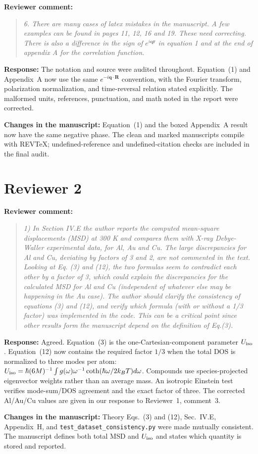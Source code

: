 \documentclass[11pt]{article}
\newcommand{\Question}[1]{\par\medskip\noindent\textbf{Reviewer comment:}\par\begin{quote}\itshape #1\end{quote}}
\newcommand{\Answer}[1]{\par\noindent\color{black}\normalfont\textbf{Response:} #1\par\smallskip}
\newcommand{\Change}[1]{\par\noindent\color{revisionblue}\normalfont\textbf{Changes in the manuscript:} #1\par\color{black}\medskip}
\begin{document}
\Question{6. There are many cases of latex mistakes in the manuscript. A few examples can be found in pages 11, 12, 16 and 19. These need correcting. There is also a difference in the sign of $e^{i\mathbf q\mathbf r}$ in equation 1 and at the end of appendix A for the correlation function.}

\Answer{The notation and source were audited throughout. Equation~(1) and Appendix~A now use the same $e^{-i\mathbf q\cdot\mathbf R}$ convention, with the Fourier transform, polarization normalization, and time-reversal relation stated explicitly. The malformed units, references, punctuation, and math noted in the report were corrected.}

\Change{Equation~(1) and the boxed Appendix~A result now have the same negative phase. The clean and marked manuscripts compile with REVTeX; undefined-reference and undefined-citation checks are included in the final audit.}

\section*{Reviewer 2}

\Question{1) In Section IV.E the author reports the computed mean-square displacements (MSD) at 300 K and compares them with X-ray Debye-Waller experimental data, for Al, Au and Cu. The large discrepancies for Al and Cu, deviating by factors of 3 and 2, are not commented in the text. Looking at Eq. (3) and (12), the two formulas seem to contradict each other by a factor of 3, which could explain the discrepancies for the calculated MSD for Al and Cu (independent of whatever else may be happening in the Au case). The author should clarify the consistency of equations (3) and (12), and verify which formula (with or without a 1/3 factor) was implemented in the code. This can be a critical point since other results form the manuscript depend on the definition of Eq.(3).}

\Answer{Agreed. Equation~(3) is the one-Cartesian-component parameter $U_{\rm iso}$. Equation~(12) now contains the required factor $1/3$ when the total DOS is normalized to three modes per atom: $U_{\rm iso}=\hbar(6M)^{-1}\int g(\omega)\omega^{-1}\coth(\hbar\omega/2k_BT)d\omega$. Compounds use species-projected eigenvector weights rather than an average mass. An isotropic Einstein test verifies mode-sum/DOS agreement and the exact factor of three. The corrected Al/Au/Cu values are given in our response to Reviewer~1, comment~3.}

\Change{Theory Eqs.~(3) and (12), Sec.~IV.E, Appendix~H, and \texttt{test\_dataset\_consistency.py} were made mutually consistent. The manuscript defines both total MSD and $U_{\rm iso}$ and states which quantity is stored and reported.}
\end{document}
